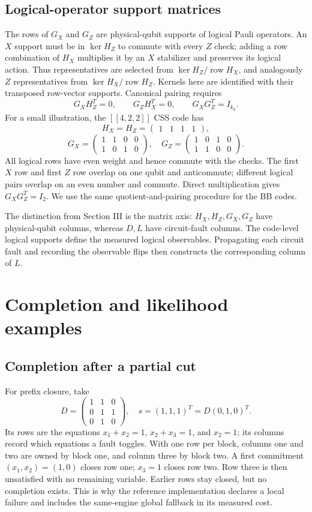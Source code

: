 \subsection{Logical-operator support matrices}
The rows of $G_X$ and $G_Z$ are physical-qubit supports of logical Pauli operators. An $X$ support must be in $\ker H_Z$ to commute with every $Z$ check; adding a row combination of $H_X$ multiplies it by an $X$ stabilizer and preserves its logical action. Thus representatives are selected from $\ker H_Z/\operatorname{row}H_X$, and analogously $Z$ representatives from $\ker H_X/\operatorname{row}H_Z$. Kernels here are identified with their transposed row-vector supports. Canonical pairing requires
\[G_XH_Z^T=0,\qquad G_ZH_X^T=0,\qquad G_XG_Z^T=I_{k_q}.\]
For a small illustration, the $[[4,2,2]]$ CSS code has
\[H_X=H_Z=\begin{pmatrix}1&1&1&1\end{pmatrix},\]
\[G_X=\begin{pmatrix}1&1&0&0\\1&0&1&0\end{pmatrix},\quad G_Z=\begin{pmatrix}1&0&1&0\\1&1&0&0\end{pmatrix}.\]
All logical rows have even weight and hence commute with the checks. The first $X$ row and first $Z$ row overlap on one qubit and anticommute; different logical pairs overlap on an even number and commute. Direct multiplication gives $G_XG_Z^T=I_2$. We use the same quotient-and-pairing procedure for the BB codes.

The distinction from Section III is the matrix axis: $H_X,H_Z,G_X,G_Z$ have physical-qubit columns, whereas $D,L$ have circuit-fault columns. The code-level logical supports define the measured logical observables. Propagating each circuit fault and recording the observable flips then constructs the corresponding column of $L$.

\section{Completion and likelihood examples}\label{app:examples}
\subsection{Completion after a partial cut}
For prefix closure, take
\[D=\begin{pmatrix}1&1&0\\0&1&1\\0&1&0\end{pmatrix},\quad s=(1,1,1)^T=D(0,1,0)^T.\]
Its rows are the equations $x_1+x_2=1$, $x_2+x_3=1$, and $x_2=1$; its columns record which equations a fault toggles. With one row per block, columns one and two are owned by block one, and column three by block two. A first commitment $(x_1,x_2)=(1,0)$ closes row one; $x_3=1$ closes row two. Row three is then unsatisfied with no remaining variable. Earlier rows stay closed, but no completion exists. This is why the reference implementation declares a local failure and includes the same-engine global fallback in its measured cost.


